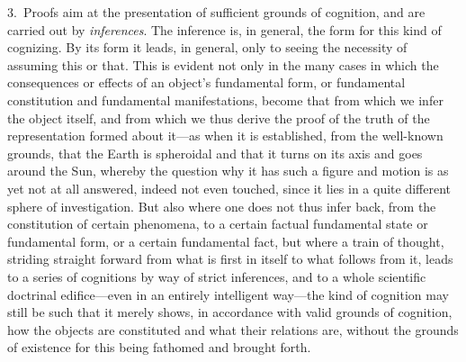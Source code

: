 \documentclass[12pt,a4paper]{book}
\begin{document}
3.~Proofs aim at the presentation of sufficient grounds of cognition, and are
carried out by \emph{inferences}. The inference is, in general, the form for this
kind of cognizing. By its form it leads, in general, only to seeing the necessity
of assuming this or that. This is evident not only in the many cases in which the
consequences or effects of an object's fundamental form, or fundamental
constitution and fundamental manifestations, become that from which we infer the
object itself, and from which we thus derive the proof of the truth of the
representation formed about it---as when it is established, from the well-known
grounds, that the Earth is spheroidal and that it turns on its axis and goes
around the Sun, whereby the question why it has such a figure and motion is as yet
not at all answered, indeed not even touched, since it lies in a quite different
sphere of investigation. But also where one does not thus infer back, from the
constitution of certain phenomena, to a certain factual fundamental state or
fundamental form, or a certain fundamental fact, but where a train of thought,
striding straight forward from what is first in itself to what follows from it,
leads to a series of cognitions by way of strict inferences, and to a whole
scientific doctrinal edifice---even in an entirely intelligent way---the kind of
cognition may still be such that it merely shows, in accordance with valid grounds
of cognition, how the objects are constituted and what their relations are,
without the grounds of existence for this being fathomed and brought forth.
\end{document}
